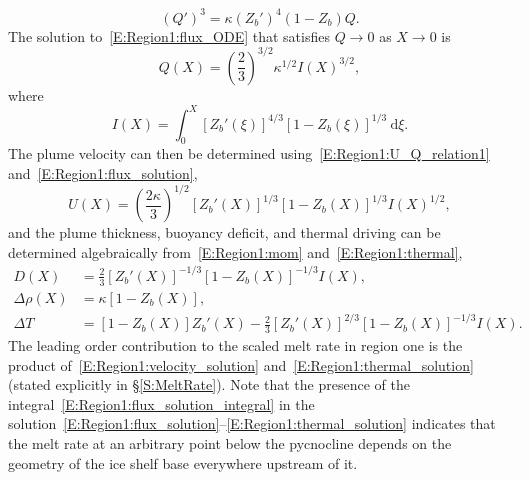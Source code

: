 \documentclass[openacc]{rsproca_new}%
\begin{document}
\begin{equation}\label{E:Region1:flux_ODE}
(Q')^3 = \kappa\left(Z_b'\right)^4 \left(1-Z_b\right)Q.
\end{equation}
The solution to~\eqref{E:Region1:flux_ODE} that satisfies $Q \to 0$ as $X \to 0$ is
\begin{equation}\label{E:Region1:flux_solution}
Q(X) =  \left(\frac{2}{3}\right)^{3/2} \kappa^{1/2}I(X)^{3/2},
\end{equation}
where 
\begin{equation}\label{E:Region1:flux_solution_integral}
I(X) =  \int_0^X \left[Z_b'(\xi)\right]^{4/3}\left[1 - Z_b(\xi)\right]^{1/3}~\mathrm{d}\xi.
\end{equation}
The plume velocity can then be determined using~\eqref{E:Region1:U_Q_relation1} and~\eqref{E:Region1:flux_solution},
\begin{equation}\label{E:Region1:velocity_solution}
U(X) =\left(\frac{2\kappa}{3}\right)^{1/2}\left[Z_b'(X)\right]^{1/3}\left[1 - Z_b(X)\right]^{1/3}I(X)^{1/2},
\end{equation}
and the plume thickness, buoyancy deficit, and thermal driving can be determined algebraically from~\eqref{E:Region1:mom} and~\eqref{E:Region1:thermal},
\begin{align}
D(X) &= \frac{2}{3}\left[Z_b'(X)\right]^{-1/3}\left[1 - Z_b(X)\right]^{-1/3}I(X),\label{E:Region1:thickness_solution}\\
\Delta \rho(X) &= \kappa \left[ 1- Z_b(X)\right],\label{E:Region1:buoyancy_solution}\\
\Delta T &= \left[1-Z_b(X)\right]Z_b'(X) - \frac{2}{3}\left[Z_b'(X)\right]^{2/3} \left[1-Z_b(X)\right]^{-1/3}I(X). \label{E:Region1:thermal_solution}
\end{align}
The leading order contribution to the scaled melt rate in region one is the product of~\eqref{E:Region1:velocity_solution} and~\eqref{E:Region1:thermal_solution} (stated explicitly in \S\ref{S:MeltRate}). Note that the presence of the integral~\eqref{E:Region1:flux_solution_integral}  in the solution~\eqref{E:Region1:flux_solution}--\eqref{E:Region1:thermal_solution} indicates that the melt rate at an arbitrary point below the pycnocline depends on the geometry of the ice shelf base everywhere upstream of it.
\end{document}
